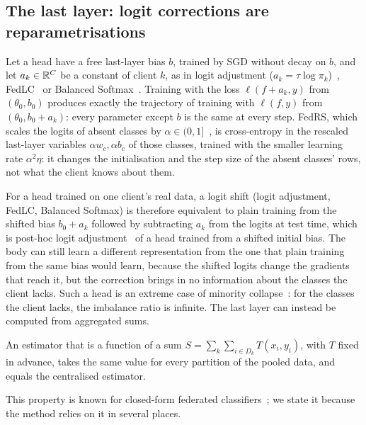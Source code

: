 \subsection{The last layer: logit corrections are reparametrisations}\label{sec:analysis-head}

\begin{lemma}\label{prop:reparam}
Let a head have a free last-layer bias $b$, trained by SGD without decay on $b$, and let $a_k\in\mathbb{R}^C$ be a constant
of client $k$, as in logit adjustment ($a_k=\tau\log\pi_k$)~\cite{menon2021la}, FedLC~\cite{zhang2022fedlc} or Balanced
Softmax~\cite{ren2020bsm}. Training with the loss $\ell(f+a_k,y)$ from $(\theta_0,b_0)$ produces exactly the trajectory
of training with $\ell(f,y)$ from $(\theta_0,b_0+a_k)$: every parameter except $b$ is the same at every step. FedRS,
which scales the logits of absent classes by $\alpha\in(0,1]$~\cite{li2021fedrs}, is cross-entropy in the rescaled
last-layer variables $\alpha w_c,\alpha b_c$ of those classes, trained with the smaller learning rate $\alpha^2\eta$:
it changes the initialisation and the step size of the absent classes' rows, not what the client knows about them.
\end{lemma}

For a head trained on one client's real data, a logit shift (logit adjustment, FedLC, Balanced Softmax) is therefore
equivalent to plain training from the shifted bias $b_0+a_k$ followed by subtracting $a_k$ from the logits at test
time, which is post-hoc logit adjustment~\cite{menon2021la} of a head trained from a shifted initial bias. The body
can still learn a different representation from the one that plain training from the same bias would learn, because
the shifted logits change the gradients that reach it, but the correction brings in no information about the classes the client lacks.
Such a head is an extreme case of minority collapse~\cite{fang2021minority}: for the classes the client lacks, the
imbalance ratio is infinite. The last layer can instead be computed
from aggregated sums.

\begin{lemma}\label{prop:invariance}
An estimator that is a function of a sum $S=\sum_k\sum_{i\in D_k}T(x_i,y_i)$, with $T$ fixed in advance, takes the same
value for every partition of the pooled data, and equals the centralised estimator.
\end{lemma}
This property is known for closed-form federated classifiers~\cite{fani2024fed3r,he2025afl,goswami2025fedcof}; we
state it because the method relies on it in several places.

